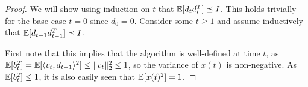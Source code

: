 \begin{proof}
We will show using induction on $t$ that $\mathbb{E}[d_{t}d_{t}^T]\preceq I$. 
This holds trivially for the base case $t=0$ since $d_0 = 0$. Consider some $t\geq 1$ and assume
inductively that $\mathbb{E}[d_{t-1}d_{t-1}^T]\preceq I$. 

First note that this implies that the algorithm is well-defined at time $t$, as  $\mathbb{E}[b_t^2] 
=\mathbb{E}[\langle v_t, d_{t-1} \rangle^2]\le \|v_t\|_2^2
\le 1$, so the variance of $x(t)$ is non-negative.
As $\mathbb{E}[b_t^2] \le 1$, it is also easily seen that $\mathbb{E}[x(t)^2] = 1$.
    


\end{proof}
